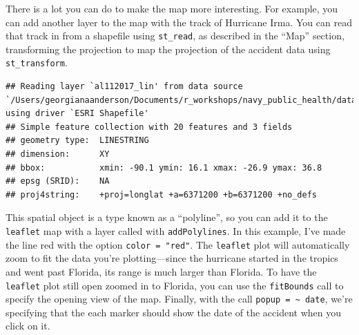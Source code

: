 \documentclass[]{tufte-book}
\newenvironment{Shaded}{}{}
\newcommand{\DataTypeTok}[1]{\textcolor[rgb]{0.56,0.13,0.00}{#1}}
\newcommand{\DecValTok}[1]{\textcolor[rgb]{0.25,0.63,0.44}{#1}}
\newcommand{\FloatTok}[1]{\textcolor[rgb]{0.25,0.63,0.44}{#1}}
\newcommand{\KeywordTok}[1]{\textcolor[rgb]{0.00,0.44,0.13}{\textbf{#1}}}
\newcommand{\NormalTok}[1]{#1}
\newcommand{\OperatorTok}[1]{\textcolor[rgb]{0.40,0.40,0.40}{#1}}
\newcommand{\StringTok}[1]{\textcolor[rgb]{0.25,0.44,0.63}{#1}}
\begin{document}
There is a lot you can do to make the map more interesting. For example, you can add another layer
to the map with the track of Hurricane Irma. You can read that track in from a shapefile using
\texttt{st\_read}, as described in the ``Map'' section, transforming the projection to map the projection
of the accident data using \texttt{st\_transform}.

\begin{Shaded}
\end{Shaded}

\begin{verbatim}
## Reading layer `al112017_lin' from data source `/Users/georgianaanderson/Documents/r_workshops/navy_public_health/data/al112017_best_track' using driver `ESRI Shapefile'
## Simple feature collection with 20 features and 3 fields
## geometry type:  LINESTRING
## dimension:      XY
## bbox:           xmin: -90.1 ymin: 16.1 xmax: -26.9 ymax: 36.8
## epsg (SRID):    NA
## proj4string:    +proj=longlat +a=6371200 +b=6371200 +no_defs
\end{verbatim}

This spatial object is a type known as a ``polyline'', so you can add it to the \texttt{leaflet} map with a
layer called with \texttt{addPolylines}. In this example, I've made the line red with the option
\texttt{color\ =\ "red"}. The \texttt{leaflet} plot will automatically zoom to fit the data you're plotting---since
the hurricane started in the tropics and went past Florida, its range is much larger than Florida.
To have the \texttt{leaflet} plot still open zoomed in to Florida, you can use the \texttt{fitBounds} call to
specify the opening view of the map. Finally, with the call \texttt{popup\ =\ \textasciitilde{}\ date}, we're specifying that
the each marker should show the date of the accident when you click on it.

\begin{Shaded}
\end{Shaded}
\end{document}
